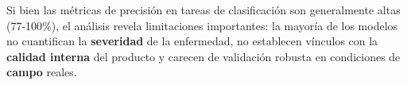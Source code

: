 \documentclass[agriculture,article,submit,pdftex,moreauthors]{Definitions/mdpi}
\begin{document}
Si bien las métricas de precisión en tareas de clasificación son generalmente altas (77-100\%), el análisis revela limitaciones importantes: la mayoría de los modelos no cuantifican la \textbf{severidad} de la enfermedad, no establecen vínculos con la \textbf{calidad interna} del producto y carecen de validación robusta en condiciones de \textbf{campo} reales.



\end{document}
